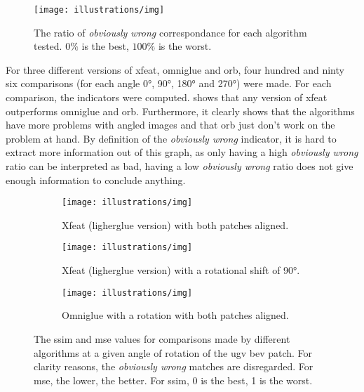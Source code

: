 \begin{figure}[ht!]
    \centering
    \texttt{[image: illustrations/img]}
    \caption{The ratio of \textit{obviously wrong} correspondance for each algorithm tested.
        $0\%$ is the best, $100\%$ is the worst.}
    \label{fig:find_corr:big_angles:obviously_wrong}
\end{figure}

For three different versions of xfeat, omniglue and orb, four hundred and ninty six comparisons (for each angle 0°, 90°, 180° and 270°) were made.
For each comparison, the indicators were computed.
 shows that any version of xfeat outperforms omniglue and orb.
Furthermore, it clearly shows that the algorithms have more problems with angled images and that orb just don't work on the problem at hand.
By definition of the \textit{obviously wrong} indicator, it is hard to extract more information out of this graph, as only having
a high \textit{obviously wrong} ratio can be interpreted as bad, having a low \textit{obviously wrong} ratio does not give enough
information to conclude anything.

\begin{figure}[ht!]
    \centering
    \begin{subfigure}[t]{0.32\textwidth}
        \texttt{[image: illustrations/img]}
        \caption{Xfeat (ligherglue version) with both patches aligned.}
        \label{fig:find_corr:big_angles:mse_ssim_xfeat+lg_0} %
    \end{subfigure}
    \hfill
    \begin{subfigure}[t]{0.32\textwidth}
        \texttt{[image: illustrations/img]}
        \caption{Xfeat (ligherglue version) with a rotational shift of 90°.}
        \label{fig:find_corr:big_angles:mse_ssim_xfeat+lg_90}
    \end{subfigure}
    \hfill
    \begin{subfigure}[t]{0.32\textwidth}
        \texttt{[image: illustrations/img]}
        \caption{Omniglue with a rotation with both patches aligned.}
        \label{fig:find_corr:big_angles:mse_ssim_omniglue_0}
    \end{subfigure}
    \caption{The \gls{ssim} and \gls{mse} values for comparisons made by different algorithms at a given angle of rotation of the \gls{ugv} bev patch.
    For clarity reasons, the \textit{obviously wrong} matches are disregarded.
    For \gls{mse}, the lower, the better. For \gls{ssim}, 0 is the best, 1 is the worst.}
    \label{fig:find_corr:big_angles:mse_ssim}
\end{figure}

